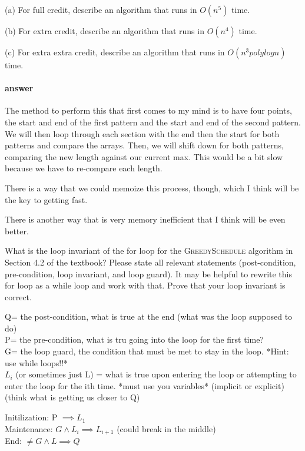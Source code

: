 \documentclass{article}
\begin{document}
(a) For full credit, describe an algorithm that runs in $O(n^{5})$ time.

(b) For extra credit, describe an algorithm that runs in $O(n^{4})$ time.

(c) For extra extra credit, describe an algorithm that runs in $O(n^{3} polylog n)$
time.

\paragraph{answer}

The method to perform this that first comes to my mind is to have four points,
the start and end of the first pattern and the start and end of the second pattern.
We will then loop through each section with the end then the start for both patterns
and compare the arrays. Then, we will shift down for both patterns, comparing the new
length against our current max. This would be a bit slow because we have to re-compare
each length.

There is a way that we could memoize this process, though, which I think will be the
key to getting fast.

There is another way that is very memory inefficient that I think will be even better.

\todo{}

\collab{}

What is the loop invariant of the for loop for the \textsc{GreedySchedule}
algorithm in Section 4.2 of the textbook?  Please state all relevant statements
(post-condition, pre-condition, loop invariant, and loop guard).  It may be
helpful to rewrite this for loop as a while loop and work with that.  Prove that
your loop invariant is correct.

Q= the post-condition, what is true at the end (what was the loop supposed to do) \\
P= the pre-condition, what is tru going into the loop for the first time? \\
G= the loop guard, the condition that must be met to stay in the loop. *Hint: use while loops!!* \\
$L_{i}$ (or sometimes just L) = what is true upon entering the loop or attempting to enter the loop for the ith time. *must use you variables* (implicit or explicit) (think what is getting us closer to Q)

Initilization: P $\implies L_{1}$ \\
Maintenance: $G \wedge L_{i} \implies L_{i+1}$ (could break in the middle) \\
End: $\neq G \wedge L \implies Q$
\end{document}
